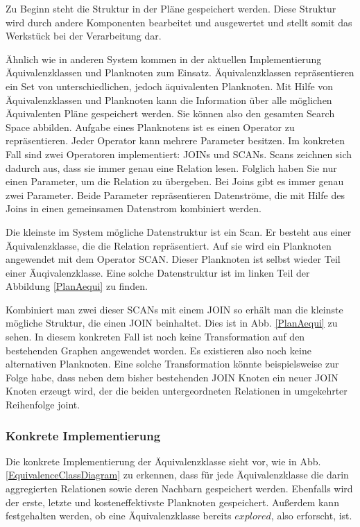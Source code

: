Zu  Beginn steht die Struktur in der Pläne gespeichert werden. Diese Struktur wird durch andere Komponenten bearbeitet und ausgewertet und stellt somit das Werkstück bei der Verarbeitung dar.

Ähnlich wie in anderen System kommen in der aktuellen Implementierung Äquivalenzklassen und Planknoten zum Einsatz. Äquivalenzklassen repräsentieren ein Set von unterschiedlichen, jedoch äquivalenten Planknoten. Mit Hilfe von Äquivalenzklassen und Planknoten kann die Information über alle möglichen Äquivalenten Pläne gespeichert werden. Sie können also den gesamten Search Space abbilden.
 Aufgabe eines Planknotens ist es einen Operator zu repräsentieren. Jeder Operator kann mehrere Parameter besitzen. Im konkreten Fall sind zwei Operatoren implementiert: JOINs und SCANs. Scans zeichnen sich dadurch aus, dass sie immer genau eine Relation lesen. Folglich haben Sie nur einen Parameter, um die Relation zu übergeben. Bei Joins gibt es immer genau zwei Parameter. Beide Parameter repräsentieren Datenströme, die mit Hilfe des Joins in einen gemeinsamen Datenstrom kombiniert werden.

Die kleinste im System mögliche Datenstruktur ist ein Scan. Er besteht aus einer Äquivalenzklasse, die die Relation repräsentiert. Auf sie wird ein Planknoten angewendet mit dem Operator SCAN. Dieser Planknoten ist selbst wieder Teil einer Äuqivalenzklasse. Eine solche Datenstruktur ist im linken Teil der Abbildung \ref{PlanAequi} zu finden.

Kombiniert man zwei dieser SCANs mit einem JOIN so erhält man die kleinste mögliche Struktur, die einen JOIN beinhaltet. Dies ist in Abb. \ref{PlanAequi} zu sehen. In diesem konkreten Fall ist noch keine Transformation auf den bestehenden Graphen angewendet worden. Es existieren also noch keine alternativen Planknoten. Eine solche Transformation könnte beispielsweise zur Folge habe, dass neben dem bisher bestehenden JOIN Knoten ein neuer JOIN Knoten erzeugt wird, der die beiden untergeordneten Relationen in umgekehrter Reihenfolge joint.


\subsubsection{Konkrete Implementierung}

Die konkrete Implementierung der Äquivalenzklasse sieht vor, wie in Abb. \ref{EquivalenceClassDiagram} zu erkennen, dass für jede Äquivalenzklasse die darin aggregierten Relationen sowie deren Nachbarn gespeichert werden. Ebenfalls wird der erste, letzte und kosteneffektivste Planknoten gespeichert. Außerdem kann festgehalten werden, ob eine Äquivalenzklasse bereits $explored$, also erforscht, ist. 






